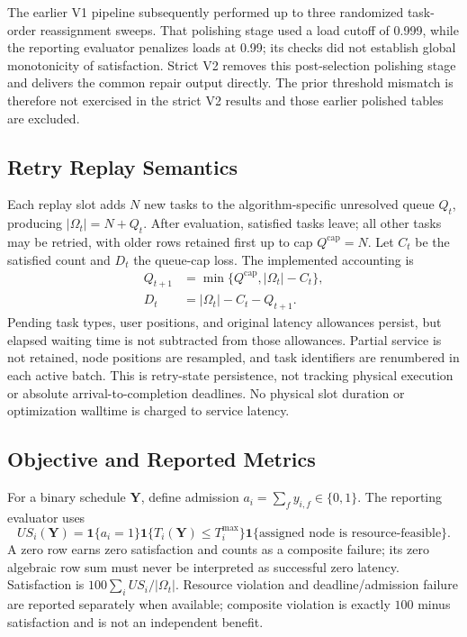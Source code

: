 \documentclass[pdflatex,sn-mathphys-num]{sn-jnl}
\begin{document}
The earlier V1 pipeline subsequently performed up to three randomized task-order reassignment sweeps. That polishing stage used a load cutoff of 0.999, while the reporting evaluator penalizes loads at 0.99; its checks did not establish global monotonicity of satisfaction. Strict V2 removes this post-selection polishing stage and delivers the common repair output directly. The prior threshold mismatch is therefore not exercised in the strict V2 results and those earlier polished tables are excluded.

\subsection{Retry Replay Semantics}
\label{sec:dynamic_rollout}
Each replay slot adds $N$ new tasks to the algorithm-specific unresolved queue $Q_t$, producing $|\Omega_t|=N+Q_t$. After evaluation, satisfied tasks leave; all other tasks may be retried, with older rows retained first up to cap $Q^{\mathrm{cap}}=N$. Let $C_t$ be the satisfied count and $D_t$ the queue-cap loss. The implemented accounting is
\begin{align}
 Q_{t+1}&=\min\{Q^{\mathrm{cap}},|\Omega_t|-C_t\},\\
 D_t&=|\Omega_t|-C_t-Q_{t+1}.
\end{align}
Pending task types, user positions, and original latency allowances persist, but elapsed waiting time is not subtracted from those allowances. Partial service is not retained, node positions are resampled, and task identifiers are renumbered in each active batch. This is retry-state persistence, not tracking physical execution or absolute arrival-to-completion deadlines. No physical slot duration or optimization walltime is charged to service latency.

\subsection{Objective and Reported Metrics}
\label{sec:problem}
For a binary schedule $\mathbf{Y}$, define admission $a_i=\sum_f y_{i,f}\in\{0,1\}$. The reporting evaluator uses
\begin{equation}
 US_i(\mathbf{Y})=\mathbf{1}\{a_i=1\}\mathbf{1}\{T_i(\mathbf{Y})\le T_i^{\max}\}
 \mathbf{1}\{\text{assigned node is resource-feasible}\}.
\end{equation}
A zero row earns zero satisfaction and counts as a composite failure; its zero algebraic row sum must never be interpreted as successful zero latency. Satisfaction is $100\sum_i US_i/|\Omega_t|$. Resource violation and deadline/admission failure are reported separately when available; composite violation is exactly $100$ minus satisfaction and is not an independent benefit.
\end{document}
